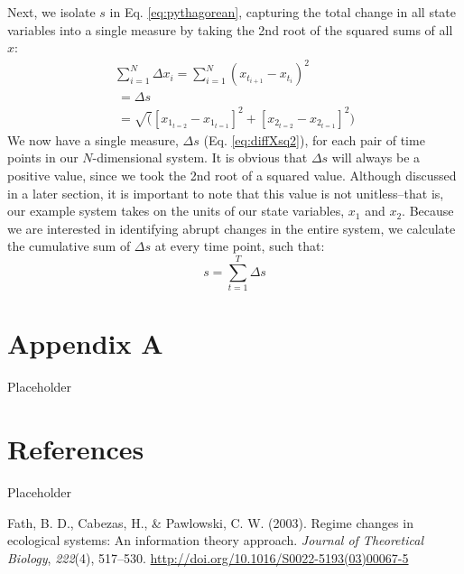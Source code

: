 \documentclass[12pt,twoside,openany]{reedthesis}
\begin{document}
Next, we isolate \(s\) in Eq. \eqref{eq:pythagorean}, capturing the total change in all state variables into a single measure by taking the 2nd root of the squared sums of all \(x\):
\begin{equation}
\begin{array}{rcr}
\sum_{i=1}^{N} \Delta {x_i} = \sum_{i=1}^{N}(x_{t_{i+1}} - x_{t_i})^2 \\ 
\ = \Delta s \\ 
\ = \sqrt([x_{1_{t=2}} - x_{1_{t=1}}]^2 + [x_{2_{t=2}} - x_{2_{t=1}}]^2)
\end{array}
\label{eq:diffXsq2}
\end{equation}
We now have a single measure, \(\Delta s\) (Eq. \eqref{eq:diffXsq2}), for each pair of time points in our \(N\)-dimensional system. It is obvious that \(\Delta s\) will always be a positive value, since we took the 2nd root of a squared value. Although discussed in a later section, it is important to note that this value is not unitless--that is, our example system takes on the units of our state variables, \(x_1\) and \(x_2\). Because we are interested in identifying abrupt changes in the entire system, we calculate the cumulative sum of \(\Delta s\) at every time point, such that:
\begin{equation}
s = \sum_{t=1}^T \Delta s
\label{eq:s}
\end{equation}
\hypertarget{rRDM}{%
\chapter*{Appendix A}\label{rRDM}}

Placeholder

\hypertarget{references}{%
\chapter*{References}\label{references}}

Placeholder

\hypertarget{refs}{}
\leavevmode\hypertarget{ref-fath_regime_2003}{}%
Fath, B. D., Cabezas, H., \& Pawlowski, C. W. (2003). Regime changes in ecological systems: An information theory approach. \emph{Journal of Theoretical Biology}, \emph{222}(4), 517--530. \url{http://doi.org/10.1016/S0022-5193(03)00067-5}
\end{document}

